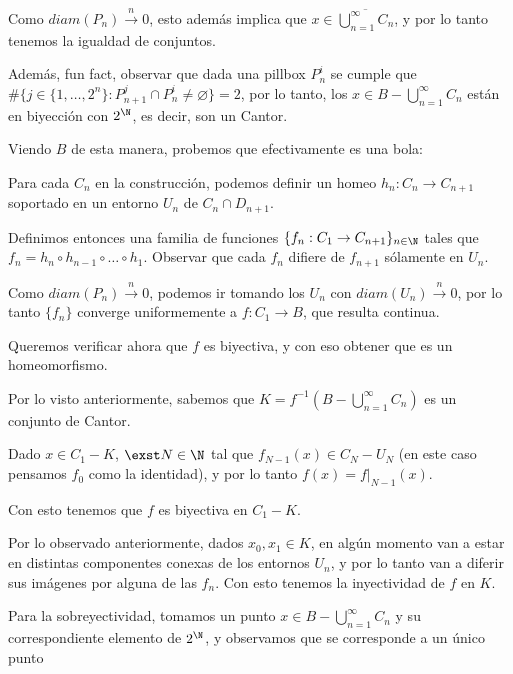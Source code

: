 Como $diam(P_n)\xrightarrow{n} 0$, esto además implica que $x\in\overline{\bigcup\limits_{n=1}^\infty C_n}$, y por lo tanto tenemos la igualdad de conjuntos. 

Además, fun fact, observar que dada una pillbox $P_n^i$ se cumple que $\#\big\{j\in\{1,\dots, 2^n\}:P_{n+1}^j\cap P_n^i\neq\varnothing\big\}=2$, por lo tanto, los $x\in B-\bigcup\limits_{n=1}^\infty C_n$ están en biyección con $2^{\N}$, es decir, son un Cantor. 

Viendo $B$ de esta manera, probemos que efectivamente es una bola: 

Para cada $C_n$ en la construcción, podemos definir un homeo $h_n:C_n\to C_{n+1}$ soportado en un entorno $U_n$ de $C_n\cap D_{n+1}$. 

Definimos entonces una familia de funciones $\{f_n:C_1\to C_{n+1}\}_{n\in\N}$ tales que $f_n=h_n\circ h_{n-1}\circ\dots\circ h_1$. Observar que cada $f_n$ difiere de $f_{n+1}$ sólamente en $U_n$.

Como $diam(P_n)\xrightarrow n 0$, podemos ir tomando los $U_n$ con $diam(U_n)\xrightarrow n 0$, por lo tanto $\{f_n\}$ converge uniformemente a $f:C_1\to B$, que resulta continua. 

Queremos verificar ahora que $f$ es biyectiva, y con eso obtener que es un homeomorfismo. 

Por lo visto anteriormente, sabemos que $K=f^{-1}(B-\bigcup\limits_{n=1}^{\infty}C_n)$ es un conjunto de Cantor. 

Dado $x\in C_1- K$, $\exst N\in\N$ tal que $f_{N-1}(x)\in C_{N}-U_N$ (en este caso pensamos $f_0$ como la identidad), y por lo tanto $f(x)=f|_{N-1}(x)$. 
            
Con esto tenemos que $f$ es biyectiva en $C_1- K$. 

Por lo observado anteriormente, dados $x_0, x_1\in K$, en algún momento van a estar en distintas componentes conexas de los entornos $U_n$, y por lo tanto van a diferir sus imágenes por alguna de las $f_n$. Con esto tenemos la inyectividad de $f$ en $K$. 

Para la sobreyectividad, tomamos un punto $x\in B-\bigcup\limits_{n=1}^{\infty}C_n$ y su correspondiente elemento de $2^\N$, y observamos que se corresponde a un único punto 
